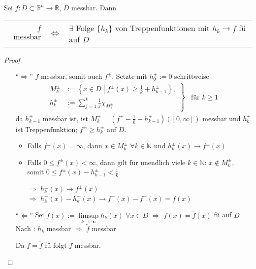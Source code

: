 \begin{proposition}
	Sei $f:D\subset\mathbb{R}^n\to\overline{\mathbb{R}}$, $D$ messbar. Dann
	\begin{center}
	\begin{tabularx}{\linewidth}{r@{\ \ }c@{\ \ }X}
		\hspace*{0.19\linewidth} $f$ messbar & $\Leftrightarrow$ & $\exists$ Folge $\{ h_k\}$ von Treppenfunktionen mit $h_k\to f$ \gls{fü} auf $D$
	\end{tabularx}
	\end{center}
\end{proposition}
\begin{proof}\hspace*{0pt}
	\begin{itemize}[topsep=\dimexpr-\baselineskip/2\relax]
		\item["`$\Rightarrow$"'] $f$ messbar, somit auch $f^{\pm}$. Setzte mit $h_0^{\pm} := 0$ schrittweise \begin{align*}
			\left.\begin{aligned}
			M_k^{\pm} &:= \left\{ x\in D \;\left|\; f^{\pm}(x) \ge \frac{1}{k} + h_{k-1}^\pm \right.\right\}, \\
			h_k^{\pm} &:= \sum_{j=1}^k \frac{1}{j}\chi_{M_j^{\pm}}
			\end{aligned}\right\}\begin{gathered}
				\;\,\text{für $k\ge 1$}
			\end{gathered}
		\end{align*}
		da $h_{k-1}^\pm$ messbar ist, ist $M_k^{\pm} = \left( f^{\pm} - \frac{1}{k} - h_{k-1}^\pm\right)([0,\infty])$ messbar und 
		$h_k^{\pm}$ ist Treppenfunktion; $f^{\pm}\ge h_k^{\pm}$ auf $D$.
		
		\begin{itemize}
		\item Falls $f^\pm(x) = \infty$, dann $x\in M_k^\pm$ $\forall k\in\mathbb{N}$ und $h_k^\pm(x)\to f^{\pm}(x)$
		
		\item Falls $0\le f^{\pm}(x) < \infty$, dann gilt für unendlich viele $k\in\mathbb{N}$: $x\notin M_k^\pm$, somit $0\le f^{\pm}(x) - h_{k-1}^\pm < \frac{1}{k}$
		
		$\Rightarrow$ $h_k^\pm(x) \to f^{\pm}(x)$\\
		$\Rightarrow$ $h_k^+(x) - h_k^-(x) \to f^+(x) - f^-(x) = f(x)$
		\end{itemize}
		
		\item["`$\Leftarrow$"']
		Sei $\tilde{f}(x) := \limsup\limits_{k\to\infty} h_k(x)$ $\forall x\in D$ $\Rightarrow$ $f(x) = \tilde{f}(x)$ \gls{fü} auf $D$ \\
		Nach : $h_k$ messbar $\Rightarrow$ $\tilde{f}$ messbar
		
		Da $f=\tilde{f}$ \gls{fü} folgt $f$ messbar.
	\end{itemize}
\end{proof}

